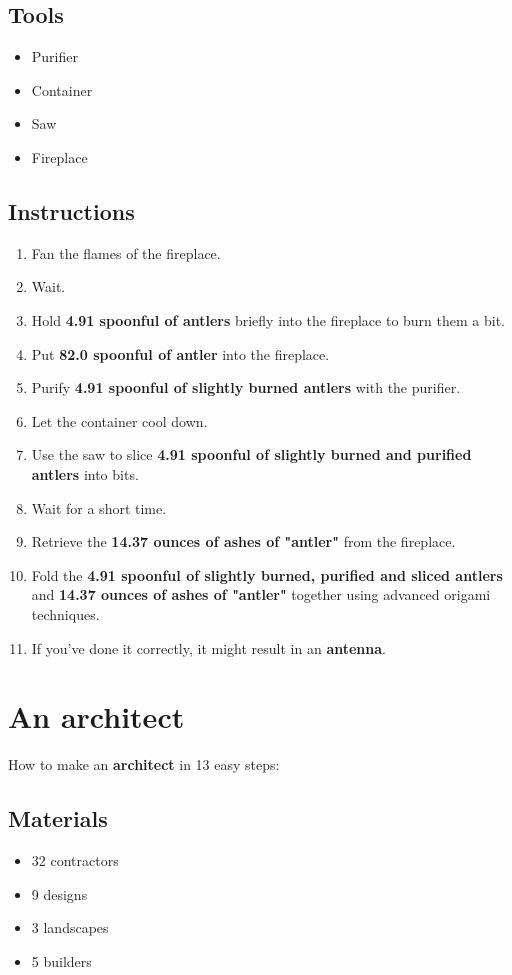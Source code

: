 \documentclass{article}
\begin{document}
\subsection{Tools}\begin{itemize}
\item 
Purifier
\item 
Container
\item 
Saw
\item 
Fireplace
\end{itemize}
\subsection{Instructions}\begin{enumerate}
\item 
Fan the flames of the fireplace.
\item 
Wait.
\item 
Hold \textbf{4.91 spoonful of antlers} briefly into the fireplace to burn them a bit.
\item 
Put \textbf{82.0 spoonful of antler} into the fireplace.
\item 
Purify \textbf{4.91 spoonful of slightly burned antlers} with the purifier.
\item 
Let the container cool down.
\item 
Use the saw to slice \textbf{4.91 spoonful of slightly burned and purified antlers} into bits.
\item 
Wait for a short time.
\item 
Retrieve the \textbf{14.37 ounces of ashes of "antler"} from the fireplace.
\item 
Fold the \textbf{4.91 spoonful of slightly burned, purified and sliced antlers} and \textbf{14.37 ounces of ashes of "antler"} together using advanced origami techniques.
\item 
If you've done it correctly, it might result in an \textbf{antenna}.
\end{enumerate}
\newpage
\section{An architect}How to make an \textbf{architect} in 13 easy steps:

\subsection{Materials}\begin{itemize}
\item 
32 contractors
\item 
9 designs
\item 
3 landscapes
\item 
5 builders
\end{itemize}
\end{document}
